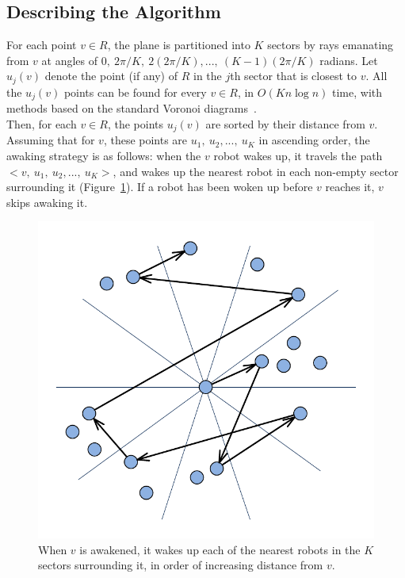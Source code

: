 \documentclass[review]{elsarticle}
\begin{document}
\subsection{Describing the Algorithm}
For each point ${ v \in R }$, the plane is partitioned into $K$ sectors by rays emanating from $v$ at angles of
${ 0, ~2\pi/K, ~2(2\pi/K), ..., ~(K-1)(2\pi/K) }$ radians.
Let $u_j(v)$ denote the point (if any) of $R$ in the $j$th sector that is closest to $v$.
All the $u_j(v)$ points can be found for every ${ v \in R }$, in ${ O(Kn\log n) }$ time, with methods based on the standard Voronoi diagrams~\cite{Clarkson1987}.\\
Then, for each ${ v \in R }$, the points $u_j(v)$ are sorted by their distance from $v$. Assuming that for $v$, these points are ${ u_1,~u_2,...,~u_K }$ in ascending order, the awaking strategy is as follows: when the $v$ robot wakes up, it travels the path ${ <v,~u_1,~u_2,...,~u_K> }$, and wakes up the nearest robot in each non-empty sector surrounding it (Figure~\ref{fig:thetagraph}). If a robot has been woken up before $v$ reaches it, $v$ skips awaking it.
\begin{figure} [h]
  \vspace{-10pt}
  \centering
  \includegraphics[scale=.5]{Figs/fig2.pdf}
  \vspace{-20pt}
  \caption{When $v$ is awakened, it wakes up each of the nearest robots in the $K$ sectors surrounding it, in order of increasing distance from $v$.}
  \label{fig:thetagraph}
\end{figure}
\end{document}
